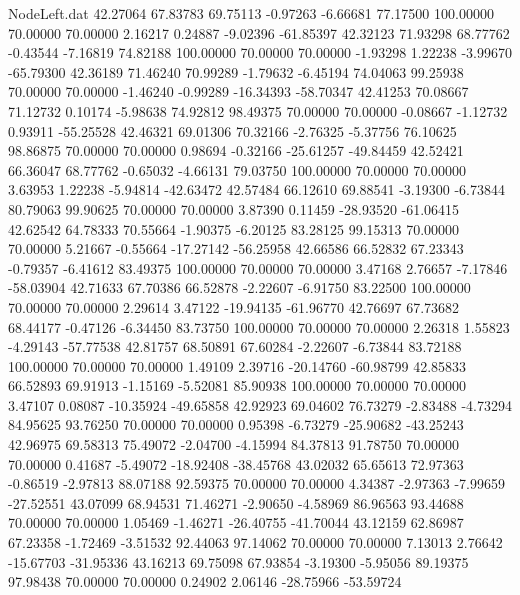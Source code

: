 \begin{filecontents}{NodeLeft.dat}
  42.27064   67.83783   69.75113    -0.97263   -6.66681   77.17500  100.00000   70.00000   70.00000    2.16217    0.24887   -9.02396  -61.85397
  42.32123   71.93298   68.77762    -0.43544   -7.16819   74.82188  100.00000   70.00000   70.00000   -1.93298    1.22238   -3.99670  -65.79300
  42.36189   71.46240   70.99289    -1.79632   -6.45194   74.04063   99.25938   70.00000   70.00000   -1.46240   -0.99289  -16.34393  -58.70347
  42.41253   70.08667   71.12732     0.10174   -5.98638   74.92812   98.49375   70.00000   70.00000   -0.08667   -1.12732    0.93911  -55.25528
  42.46321   69.01306   70.32166    -2.76325   -5.37756   76.10625   98.86875   70.00000   70.00000    0.98694   -0.32166  -25.61257  -49.84459
  42.52421   66.36047   68.77762    -0.65032   -4.66131   79.03750  100.00000   70.00000   70.00000    3.63953    1.22238   -5.94814  -42.63472
  42.57484   66.12610   69.88541    -3.19300   -6.73844   80.79063   99.90625   70.00000   70.00000    3.87390    0.11459  -28.93520  -61.06415
  42.62542   64.78333   70.55664    -1.90375   -6.20125   83.28125   99.15313   70.00000   70.00000    5.21667   -0.55664  -17.27142  -56.25958
  42.66586   66.52832   67.23343    -0.79357   -6.41612   83.49375  100.00000   70.00000   70.00000    3.47168    2.76657   -7.17846  -58.03904
  42.71633   67.70386   66.52878    -2.22607   -6.91750   83.22500  100.00000   70.00000   70.00000    2.29614    3.47122  -19.94135  -61.96770
  42.76697   67.73682   68.44177    -0.47126   -6.34450   83.73750  100.00000   70.00000   70.00000    2.26318    1.55823   -4.29143  -57.77538
  42.81757   68.50891   67.60284    -2.22607   -6.73844   83.72188  100.00000   70.00000   70.00000    1.49109    2.39716  -20.14760  -60.98799
  42.85833   66.52893   69.91913    -1.15169   -5.52081   85.90938  100.00000   70.00000   70.00000    3.47107    0.08087  -10.35924  -49.65858
  42.92923   69.04602   76.73279    -2.83488   -4.73294   84.95625   93.76250   70.00000   70.00000    0.95398   -6.73279  -25.90682  -43.25243
  42.96975   69.58313   75.49072    -2.04700   -4.15994   84.37813   91.78750   70.00000   70.00000    0.41687   -5.49072  -18.92408  -38.45768
  43.02032   65.65613   72.97363    -0.86519   -2.97813   88.07188   92.59375   70.00000   70.00000    4.34387   -2.97363   -7.99659  -27.52551
  43.07099   68.94531   71.46271    -2.90650   -4.58969   86.96563   93.44688   70.00000   70.00000    1.05469   -1.46271  -26.40755  -41.70044
  43.12159   62.86987   67.23358    -1.72469   -3.51532   92.44063   97.14062   70.00000   70.00000    7.13013    2.76642  -15.67703  -31.95336
  43.16213   69.75098   67.93854    -3.19300   -5.95056   89.19375   97.98438   70.00000   70.00000    0.24902    2.06146  -28.75966  -53.59724

\end{filecontents}
